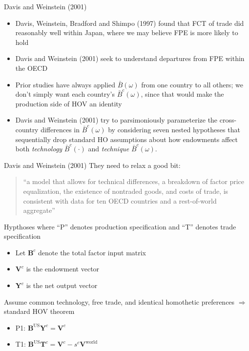\documentclass[10pt,notes=hide]{beamer}
\begin{document}
\begin{frame}{Davis and Weinstein (2001)}
\begin{itemize}
	\item Davis, Weinstein, Bradford and Shimpo (1997) found that FCT of trade did reasonably well within Japan, where we may believe FPE is more likely to hold
	\item Davis and Weinstein (2001) seek to understand departures from FPE within the OECD
	\item Prior studies have always applied $\bar{B}(\omega)$ from one country to all others; we don't simply want each country's $\bar{B}^c(\omega)$, since that would make the production side of HOV an identity
	\item Davis and Weinstein (2001) try to parsimoniously parameterize the cross-country differences in $\bar{B}^c(\omega)$ by considering seven nested hypotheses that sequentially drop standard HO assumptions about how endowments affect both \textit{technology} $\bar{B}^c(\cdot)$ and \textit{technique} $\bar{B}^c(\omega)$.
\end{itemize}
\end{frame}
\begin{frame}{Davis and Weinstein (2001)}
They need to relax a good bit:
\begin{quote}
``a model that allows for technical differences, a breakdown of factor price equalization, the existence of nontraded goods, and costs of trade, is consistent with data for ten OECD countries and a rest-of-world aggregate''
\end{quote}
Hypthoses where ``P'' denotes production specification and ``T'' denotes trade specification
\begin{itemize}
	\item Let $\mathbf{B}^c$ denote the total factor input matrix
	\item $\mathbf{V}^c$ is the endowment vector
	\item $\mathbf{Y}^c$ is the net output vector
\end{itemize}
Assume common technology, free trade, and identical homothetic preferences
$\Rightarrow$ standard HOV theorem
\begin{itemize}
	\item P1: $\mathbf{B}^{\text{US}} \mathbf{Y}^c = \mathbf{V}^c$
	\item T1: 
	$\mathbf{B}^{\text{US}} \mathbf{T}^c = \mathbf{V}^c - s^{c} \mathbf{V}^{\text{world}}$
\end{itemize}
\end{frame}
\end{document}
